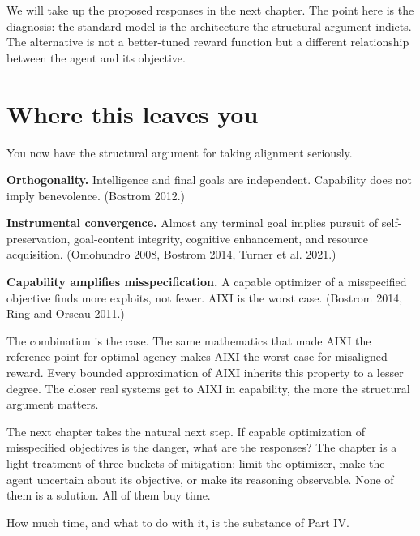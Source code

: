 We will take up the proposed responses in the next chapter. The point here is the diagnosis: the standard model is the architecture the structural argument indicts. The alternative is not a better-tuned reward function but a different relationship between the agent and its objective.

\section*{Where this leaves you}

You now have the structural argument for taking alignment seriously.

\textbf{Orthogonality.} Intelligence and final goals are independent. Capability does not imply benevolence. (Bostrom 2012.)

\textbf{Instrumental convergence.} Almost any terminal goal implies pursuit of self-preservation, goal-content integrity, cognitive enhancement, and resource acquisition. (Omohundro 2008, Bostrom 2014, Turner et al. 2021.)

\textbf{Capability amplifies misspecification.} A capable optimizer of a misspecified objective finds more exploits, not fewer. AIXI is the worst case. (Bostrom 2014, Ring and Orseau 2011.)

The combination is the case. The same mathematics that made AIXI the reference point for optimal agency makes AIXI the worst case for misaligned reward. Every bounded approximation of AIXI inherits this property to a lesser degree. The closer real systems get to AIXI in capability, the more the structural argument matters.

The next chapter takes the natural next step. If capable optimization of misspecified objectives is the danger, what are the responses? The chapter is a light treatment of three buckets of mitigation: limit the optimizer, make the agent uncertain about its objective, or make its reasoning observable. None of them is a solution. All of them buy time.

How much time, and what to do with it, is the substance of Part IV.
